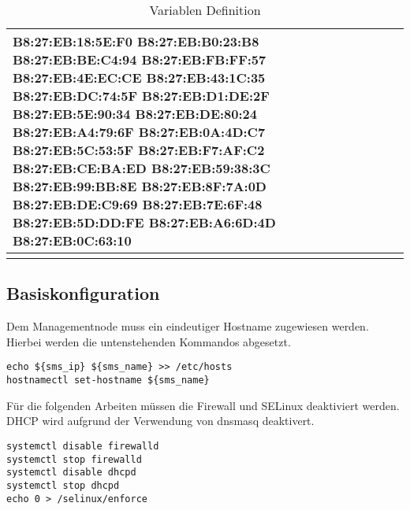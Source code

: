 \begin{longtable}{| p{0.5cm} | p{3cm} | p{8.5cm} | p{4cm} |}
B8:27:EB:18:5E:F0 \newline B8:27:EB:B0:23:B8 \newline B8:27:EB:BE:C4:94 \newline B8:27:EB:FB:FF:57 \newline B8:27:EB:4E:EC:CE \newline 	B8:27:EB:43:1C:35 \newline B8:27:EB:DC:74:5F \newline B8:27:EB:D1:DE:2F \newline B8:27:EB:5E:90:34 \newline B8:27:EB:DE:80:24 \newline B8:27:EB:A4:79:6F \newline B8:27:EB:0A:4D:C7 \newline B8:27:EB:5C:53:5F \newline B8:27:EB:F7:AF:C2 \newline B8:27:EB:CE:BA:ED \newline B8:27:EB:59:38:3C \newline B8:27:EB:99:BB:8E \newline B8:27:EB:8F:7A:0D \newline B8:27:EB:DE:C9:69 \newline B8:27:EB:7E:6F:48 \newline B8:27:EB:5D:DD:FE
\newline B8:27:EB:A6:6D:4D \newline B8:27:EB:0C:63:10\\\hline 
\caption{Variablen Definition}
\end{longtable}

\subsection{Basiskonfiguration}
Dem Managementnode muss ein eindeutiger Hostname zugewiesen werden. Hierbei werden die untenstehenden Kommandos abgesetzt.

\begin{lstlisting}
echo ${sms_ip} ${sms_name} >> /etc/hosts
hostnamectl set-hostname ${sms_name}
\end{lstlisting}

Für die folgenden Arbeiten müssen die Firewall und SELinux deaktiviert werden. DHCP wird aufgrund der Verwendung von dnsmasq deaktivert.

\begin{lstlisting}
systemctl disable firewalld
systemctl stop firewalld
systemctl disable dhcpd
systemctl stop dhcpd
echo 0 > /selinux/enforce
\end{lstlisting}

